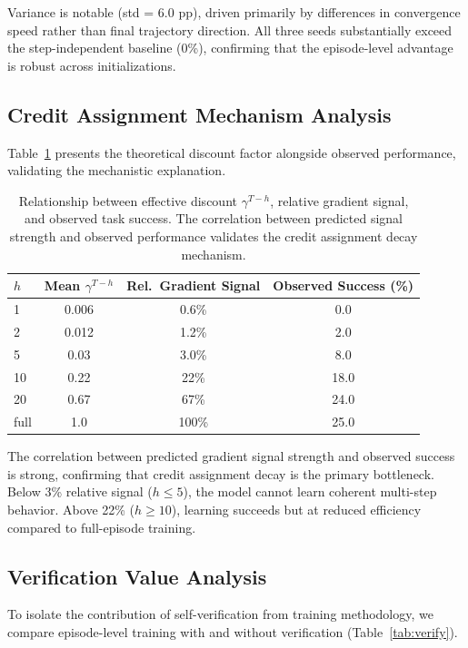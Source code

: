 \documentclass[11pt]{article}
\begin{document}
Variance is notable (std = 6.0 pp), driven primarily by differences in convergence speed rather than final trajectory direction. All three seeds substantially exceed the step-independent baseline (0\%), confirming that the episode-level advantage is robust across initializations.

\subsection{Credit Assignment Mechanism Analysis}

Table~\ref{tab:mechanism} presents the theoretical discount factor alongside observed performance, validating the mechanistic explanation.

\begin{table}[h]
\centering
\caption{Relationship between effective discount $\gamma^{T-h}$, relative gradient signal, and observed task success. The correlation between predicted signal strength and observed performance validates the credit assignment decay mechanism.}
\label{tab:mechanism}
\begin{tabular}{@{}lccc@{}}
\toprule
$h$ & Mean $\gamma^{T-h}$ & Rel.\ Gradient Signal & Observed Success (\%) \\
\midrule
1 & 0.006 & 0.6\% & 0.0 \\
2 & 0.012 & 1.2\% & 2.0 \\
5 & 0.03 & 3.0\% & 8.0 \\
10 & 0.22 & 22\% & 18.0 \\
20 & 0.67 & 67\% & 24.0 \\
full & 1.0 & 100\% & 25.0 \\
\bottomrule
\end{tabular}
\end{table}

The correlation between predicted gradient signal strength and observed success is strong, confirming that credit assignment decay is the primary bottleneck. Below 3\% relative signal ($h \leq 5$), the model cannot learn coherent multi-step behavior. Above 22\% ($h \geq 10$), learning succeeds but at reduced efficiency compared to full-episode training.

\subsection{Verification Value Analysis}

To isolate the contribution of self-verification from training methodology, we compare episode-level training with and without verification (Table~\ref{tab:verify}).
\end{document}

